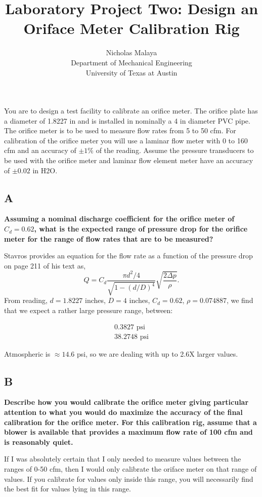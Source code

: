 \documentclass{article}
\title{\bf{Laboratory Project Two: Design an Oriface Meter Calibration Rig}}
\author{Nicholas Malaya \\ Department of Mechanical Engineering \\ University of Texas at Austin} \date{}
\begin{document}
\maketitle
\date{}

You are to design a test facility to calibrate an orifice meter. The orifice plate has a diameter of
1.8227 in and is installed in nominally a 4 in diameter PVC pipe. The orifice meter is to be used 
to measure flow rates from 5 to 50 cfm. For calibration of the orifice meter you will use a 
laminar flow meter with 0 to 160 cfm and an accuracy of $\pm 1\%$ of the reading. Assume the 
pressure transducers to be used with the orifice meter and laminar flow element meter have an 
accuracy of $\pm 0.02$ in H2O.

\subsection*{A}
\textbf{Assuming a nominal discharge coefficient for the orifice meter of $C_d = 0.62$, what is the
expected range of pressure drop for the orifice meter for the range of flow rates that are to be 
measured?}

Stavros provides an equation for the flow rate as a function of the
pressure drop on page 211 of his text as,  
\begin{equation*}
 Q = C_d \frac{\pi d^2 / 4}{\sqrt{1-(d/D)^4}}\sqrt{\frac{2 \Delta p}{\rho}}.
\end{equation*}
From reading, $d = 1.8227$ inches, $D = 4 $ inches, $C_d = 0.62$, $\rho
= 0.074887$, we find that we expect a rather large pressure range,
between:

\begin{eqnarray*}
  0.3827  \text{ psi} \\
 38.2748  \text{ psi}
\end{eqnarray*}

Atmospheric is $\approx 14.6$ psi, so we are dealing with up to 2.6X
larger values. 


\subsection*{B}
\textbf{Describe how you would calibrate the orifice meter giving
particular attention to what you would do maximize the accuracy of the
final calibration for the orifice meter. For this calibration rig,
assume that a blower is available that provides a maximum flow rate of
100 cfm and is reasonably quiet.} 

If I was absolutely certain that I only needed to measure values between the
ranges of 0-50 cfm, then I would only calibrate the oriface meter on
that range of values. If you calibrate for values only inside this
range, you will necessarily find the best fit for values lying in this
range. 
\end{document}

